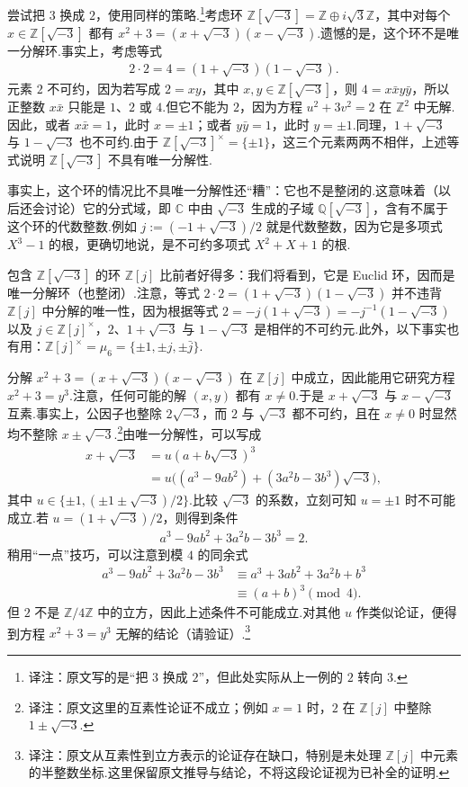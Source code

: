 \begin{example*}[{环 $\mathbb Z[\sqrt{-3}]$ 与方程 $x^2+3=y^3$}]
尝试把 $3$ 换成 $2$，使用同样的策略.\footnote{译注：原文写的是``把 $3$ 换成 $2$''，但此处实际从上一例的 $2$ 转向 $3$.}考虑环 $\mathbb Z[\sqrt{-3}]=\mathbb Z\oplus i\sqrt3\mathbb Z$，其中对每个 $x\in\mathbb Z[\sqrt{-3}]$ 都有 $x^2+3=(x+\sqrt{-3})(x-\sqrt{-3})$.遗憾的是，这个环不是唯一分解环.事实上，考虑等式
\begin{align*}
2\cdot2=4=(1+\sqrt{-3})(1-\sqrt{-3}).
\end{align*}
元素 $2$ 不可约，因为若写成 $2=xy$，其中 $x,y\in\mathbb Z[\sqrt{-3}]$，则 $4=x\bar x y\bar y$，所以正整数 $x\bar x$ 只能是 $1$、$2$ 或 $4$.但它不能为 $2$，因为方程 $u^2+3v^2=2$ 在 $\mathbb Z^2$ 中无解.因此，或者 $x\bar x=1$，此时 $x=\pm1$；或者 $y\bar y=1$，此时 $y=\pm1$.同理，$1+\sqrt{-3}$ 与 $1-\sqrt{-3}$ 也不可约.由于 $\mathbb Z[\sqrt{-3}]^\times=\{\pm1\}$，这三个元素两两不相伴，上述等式说明 $\mathbb Z[\sqrt{-3}]$ 不具有唯一分解性.

事实上，这个环的情况比不具唯一分解性还``糟''：它也不是整闭的.这意味着（以后还会讨论）它的分式域，即 $\mathbb C$ 中由 $\sqrt{-3}$ 生成的子域 $\mathbb Q[\sqrt{-3}]$，含有不属于这个环的代数整数.例如 $j:=(-1+\sqrt{-3})/2$ 就是代数整数，因为它是多项式 $X^3-1$ 的根，更确切地说，是不可约多项式 $X^2+X+1$ 的根.

包含 $\mathbb Z[\sqrt{-3}]$ 的环 $\mathbb Z[j]$ 比前者好得多：我们将看到，它是 Euclid 环，因而是唯一分解环（也整闭）.注意，等式 $2\cdot2=(1+\sqrt{-3})(1-\sqrt{-3})$ 并不违背 $\mathbb Z[j]$ 中分解的唯一性，因为根据等式 $2=-j(1+\sqrt{-3})=-j^{-1}(1-\sqrt{-3})$ 以及 $j\in\mathbb Z[j]^\times$，$2$、$1+\sqrt{-3}$ 与 $1-\sqrt{-3}$ 是相伴的不可约元.此外，以下事实也有用：$\mathbb Z[j]^\times=\mu_6=\{\pm1,\pm j,\pm\bar j\}$.

分解 $x^2+3=(x+\sqrt{-3})(x-\sqrt{-3})$ 在 $\mathbb Z[j]$ 中成立，因此能用它研究方程 $x^2+3=y^3$.注意，任何可能的解 $(x,y)$ 都有 $x\ne0$.于是 $x+\sqrt{-3}$ 与 $x-\sqrt{-3}$ 互素.事实上，公因子也整除 $2\sqrt{-3}$，而 $2$ 与 $\sqrt{-3}$ 都不可约，且在 $x\ne0$ 时显然均不整除 $x\pm\sqrt{-3}$.\footnote{译注：原文这里的互素性论证不成立；例如 $x=1$ 时，$2$ 在 $\mathbb Z[j]$ 中整除 $1\pm\sqrt{-3}$.}由唯一分解性，可以写成
\begin{align*}
x+\sqrt{-3}&=u(a+b\sqrt{-3})^3\\
&=u\bigl((a^3-9ab^2)+(3a^2b-3b^3)\sqrt{-3}\bigr),
\end{align*}
其中 $u\in\{\pm1,(\pm1\pm\sqrt{-3})/2\}$.比较 $\sqrt{-3}$ 的系数，立刻可知 $u=\pm1$ 时不可能成立.若 $u=(1+\sqrt{-3})/2$，则得到条件
\begin{align*}
a^3-9ab^2+3a^2b-3b^3=2.
\end{align*}
稍用``一点''技巧，可以注意到模 $4$ 的同余式
\begin{align*}
a^3-9ab^2+3a^2b-3b^3&\equiv a^3+3ab^2+3a^2b+b^3\\
&\equiv(a+b)^3\pmod4.
\end{align*}
但 $2$ 不是 $\mathbb Z/4\mathbb Z$ 中的立方，因此上述条件不可能成立.对其他 $u$ 作类似论证，便得到方程 $x^2+3=y^3$ 无解的结论（请验证）.\footnote{译注：原文从互素性到立方表示的论证存在缺口，特别是未处理 $\mathbb Z[j]$ 中元素的半整数坐标.这里保留原文推导与结论，不将这段论证视为已补全的证明.}
\end{example*}
